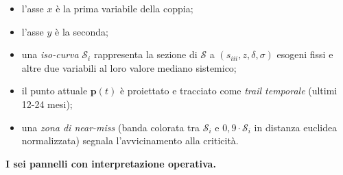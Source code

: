 \begin{itemize}
\tightlist
\item
  l'asse \(x\) è la prima variabile della coppia;
\item
  l'asse \(y\) è la seconda;
\item
  una \emph{iso-curva} \(\mathcal{S}_i\) rappresenta la sezione di
  \(\mathcal{S}\) a \((s_{iii}, z, \delta, \sigma)\) esogeni fissi e
  altre due variabili al loro valore mediano sistemico;
\item
  il punto attuale \(\boldsymbol{p}(t)\) è proiettato e tracciato come
  \emph{trail temporale} (ultimi 12-24 mesi);
\item
  una \emph{zona di near-miss} (banda colorata tra \(\mathcal{S}_i\) e
  \(0{,}9 \cdot \mathcal{S}_i\) in distanza euclidea normalizzata)
  segnala l'avvicinamento alla criticità.
\end{itemize}

\Proved{} \textbf{I sei pannelli con interpretazione operativa.}

